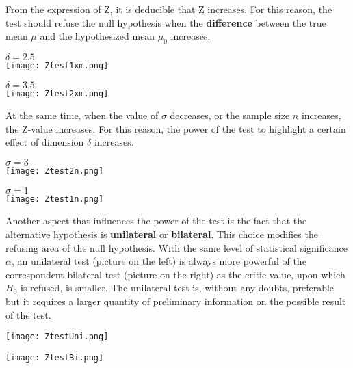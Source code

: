 \begin{frame}
  From the expression of Z, it is deducible that Z increases. For this reason, the test should refuse the null hypothesis when the \textbf{difference} between the true mean $\mu$ and the hypothesized mean $\mu_0$ increases.
  \vspace*{.3cm}
  \begin{floatingfigure}[l]{5cm}
    \centering
    $\delta=2.5$\\
    \texttt{[image: Ztest1xm.png]}\\
  \end{floatingfigure}
  \centering
  $\delta=3.5$\\
  \texttt{[image: Ztest2xm.png]}\\
\end{frame}


\begin{frame}
  At the same time, when the value of $\sigma$ decreases, or the sample size {\boldmath $ n $} increases, the Z-value increases. For this reason, the power of the test to highlight a certain effect of dimension $\delta$ increases.\\
  \begin{floatingfigure}[l]{5cm}
    \centering
    $\sigma=3$\\
    \texttt{[image: Ztest2n.png]}\\
  \end{floatingfigure}
  \centering
  $\sigma=1$\\
  \texttt{[image: Ztest1n.png]}\\
\end{frame}

\begin{frame}
  \begin{small}
    Another aspect that influences the power of the test is the fact that the alternative hypothesis is \textbf{unilateral} or \textbf{bilateral}. This choice modifies the refusing area of the null hypothesis. With the same level of statistical significance $\alpha$, an unilateral test (picture on the left) is always more powerful of the correspondent bilateral test (picture on the right) as the critic value, upon which $H_0$ is refused, is smaller. The unilateral test is, without any doubts, preferable but it requires a larger quantity of preliminary information on the possible result of the test.
  \end{small}
  \begin{floatingfigure}[l]{5cm}
    \centering
    \vspace*{-4.3cm}
    \texttt{[image: ZtestUni.png]}\\
  \end{floatingfigure}
  \vspace*{.3cm}
  \centering
  \texttt{[image: ZtestBi.png]}\\
\end{frame}

